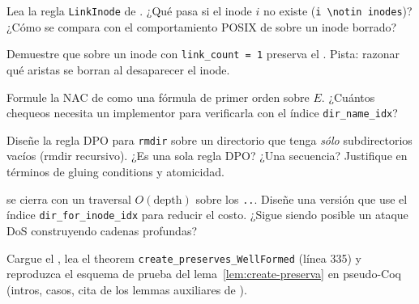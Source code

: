 \begin{ejercicio}[\dificultad{$\star\star$}]
\label{ej:dpo-4}
Lea la regla \texttt{LinkInode} de . ¿Qué
pasa si el inode $i$ no existe (\texttt{i \textbackslash notin
inodes})? ¿Cómo se compara con el comportamiento POSIX de \oplink{}
sobre un inode borrado?
\end{ejercicio}

\begin{ejercicio}[\dificultad{$\star\star$}]
\label{ej:dpo-5}
Demuestre que \opunlink{} sobre un inode con \texttt{link\_count = 1}
preserva el . Pista: razonar qué aristas se
borran al desaparecer el inode.
\end{ejercicio}

\begin{ejercicio}[\dificultad{$\star\star$}]
\label{ej:dpo-6}
Formule la NAC de \opmkdir{} como una fórmula de primer orden sobre
$E$. ¿Cuántos chequeos necesita un implementor para verificarla con el
índice \texttt{dir\_name\_idx}?
\end{ejercicio}

\begin{ejercicio}[\dificultad{$\star\star\star$}]
\label{ej:dpo-7}
Diseñe la regla DPO para \texttt{rmdir} sobre un directorio que tenga
\emph{sólo} subdirectorios vacíos (rmdir recursivo). ¿Es una sola regla
DPO? ¿Una secuencia? Justifique en términos de gluing conditions y
atomicidad.
\end{ejercicio}

\begin{ejercicio}[\dificultad{$\star\star\star$}]
\label{ej:dpo-8}
 se cierra con un traversal $O(\mathrm{depth})$
sobre los \texttt{..}. Diseñe una versión que use el índice
\texttt{dir\_for\_inode\_idx} para reducir el costo. ¿Sigue siendo
posible un ataque DoS construyendo cadenas profundas?
\end{ejercicio}

\begin{ejercicio}[\dificultad{$\star\star\star$}]
\label{ej:dpo-9}
Cargue el , lea el theorem
\texttt{create\_preserves\_WellFormed} (línea 335) y reproduzca el
esquema de prueba del lema~\ref{lem:create-preserva} en pseudo-Coq
(intros, casos, cita de los lemmas auxiliares de
).
\end{ejercicio}

